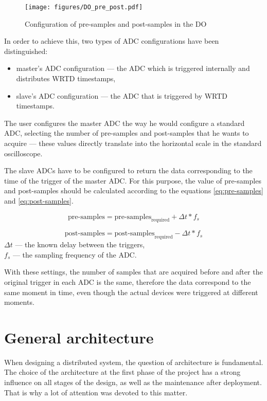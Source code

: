     \begin{figure}
    	\centerline{\texttt{[image: figures/DO\_pre\_post.pdf]}}
    	\caption{Configuration of pre-samples and post-samples in the DO}
    	\label{fig:DO_pre_post}
    \end{figure}
    
    In order to achieve this, two types of ADC configurations have been distinguished:
    \begin{itemize}
        \item master's ADC configuration --- the ADC which is triggered internally and distributes WRTD timestamps,
        \item slave's ADC configuration --- the ADC that is triggered by WRTD timestamps.
    \end{itemize}
    
    The user configures the master ADC the way he would configure a standard ADC, selecting the number of pre-samples and post-samples that he wants to acquire --- these values directly translate into the horizontal scale in the standard oscilloscope. 
    
    The slave ADCs have to be configured to return the data corresponding to the time of the trigger of the master ADC. For this purpose, the value of pre-samples and post-samples should be calculated according to the equations \ref{eq:pre-samples} and \ref{eq:post-samples}.
    
    \begin{equation}\label{eq:pre-samples}
        \text{pre-samples} = \text{pre-samples}_\text{required} + \Delta t * f_s
    \end{equation}
    
    \begin{equation} \label{eq:post-samples}
        \text{post-samples} = \text{post-samples}_\text{required} - \Delta t * f_s
    \end{equation}
    $\Delta t$ --- the known delay between the triggers,\\
    $f_s$ --- the sampling frequency of the ADC.
    
    With these settings, the number of samples that are acquired before and after the original trigger in each ADC is the same, therefore the data correspond to the same moment in time, even though the actual devices were triggered at different moments.
    
\section{General architecture} \label{section:general_architecture}
    When designing a distributed system, the question of architecture is fundamental. The choice of the architecture at the first phase of the project has a strong influence on all stages of the design, as well as the maintenance after deployment. That is why a lot of attention was devoted to this matter.
    
